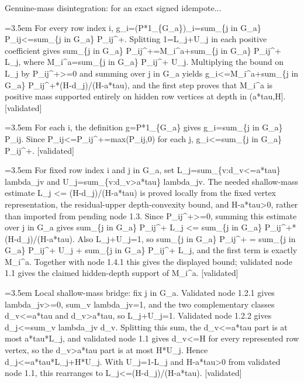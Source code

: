 \documentclass{article}
\newcommand{\step}[1]{\par\noindent\hangindent=3.5em\hangafter=1%
  \makebox[3.5em][l]{\textbf{#1.}}}
\newcommand{\steptag}[1]{\hfill{\small\textsf{[#1]}}}
\begin{document}
\begin{proofbox}{Genuine-mass disintegration: for an exact signed idempote...}
\step{1.4} For every row index i, g\_i=(P*1\_\{G\_a\})\_i=sum\_\{j in G\_a\} P\_ij<=sum\_\{j in G\_a\} P\_ij\textasciicircum{}+. Splitting 1=L\_j+U\_j in each positive coefficient gives sum\_\{j in G\_a\} P\_ij\textasciicircum{}+=M\_i\textasciicircum{}a+sum\_\{j in G\_a\} P\_ij\textasciicircum{}+ L\_j, where M\_i\textasciicircum{}a=sum\_\{j in G\_a\} P\_ij\textasciicircum{}+ U\_j. Multiplying the bound on L\_j by P\_ij\textasciicircum{}+>=0 and summing over j in G\_a yields g\_i<=M\_i\textasciicircum{}a+sum\_\{j in G\_a\} P\_ij\textasciicircum{}+*(H-d\_j)/(H-a*tau), and the first step proves that M\_i\textasciicircum{}a is positive mass supported entirely on hidden row vertices at depth in (a*tau,H]. \steptag{validated} \\[6pt]
\step{1.4.1} For each i, the definition g=P*1\_\{G\_a\} gives g\_i=sum\_\{j in G\_a\} P\_ij. Since P\_ij<=P\_ij\textasciicircum{}+=max(P\_ij,0) for each j, g\_i<=sum\_\{j in G\_a\} P\_ij\textasciicircum{}+. \steptag{validated} \\[4pt]
\step{1.4.2} For fixed row index i and j in G\_a, set L\_j=sum\_\{v:d\_v<=a*tau\} lambda\_jv and U\_j=sum\_\{v:d\_v>a*tau\} lambda\_jv. The needed shallow-mass estimate L\_j <= (H-d\_j)/(H-a*tau) is proved locally from the fixed vertex representation, the residual-upper depth-convexity bound, and H-a*tau>0, rather than imported from pending node 1.3. Since P\_ij\textasciicircum{}+>=0, summing this estimate over j in G\_a gives sum\_\{j in G\_a\} P\_ij\textasciicircum{}+ L\_j <= sum\_\{j in G\_a\} P\_ij\textasciicircum{}+*(H-d\_j)/(H-a*tau). Also L\_j+U\_j=1, so sum\_\{j in G\_a\} P\_ij\textasciicircum{}+ = sum\_\{j in G\_a\} P\_ij\textasciicircum{}+ U\_j + sum\_\{j in G\_a\} P\_ij\textasciicircum{}+ L\_j, and the first term is exactly M\_i\textasciicircum{}a. Together with node 1.4.1 this gives the displayed bound; validated node 1.1 gives the claimed hidden-depth support of M\_i\textasciicircum{}a. \steptag{validated} \\[6pt]
\step{1.4.2.1} Local shallow-mass bridge: fix j in G\_a. Validated node 1.2.1 gives lambda\_jv>=0, sum\_v lambda\_jv=1, and the two complementary classes d\_v<=a*tau and d\_v>a*tau, so L\_j+U\_j=1. Validated node 1.2.2 gives d\_j<=sum\_v lambda\_jv d\_v. Splitting this sum, the d\_v<=a*tau part is at most a*tau*L\_j, and validated node 1.1 gives d\_v<=H for every represented row vertex, so the d\_v>a*tau part is at most H*U\_j. Hence d\_j<=a*tau*L\_j+H*U\_j. With U\_j=1-L\_j and H-a*tau>0 from validated node 1.1, this rearranges to L\_j<=(H-d\_j)/(H-a*tau). \steptag{validated} \\[4pt]

\end{proofbox}
\end{document}
